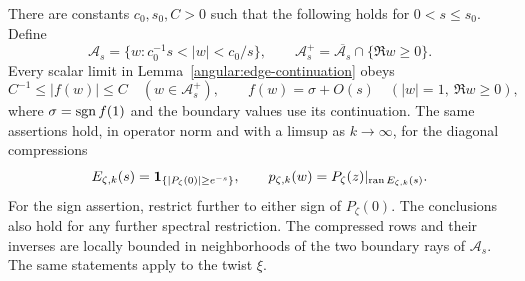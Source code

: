 \begin{lemma}
\label{angular:half-annulus}
There are constants $c_0,s_0,C>0$ such that the following holds for
$0<s\le s_0$.  Define
\[
 \mathcal A_s=\{w:c_0^{-1}s<|w|<c_0/s\},
 \qquad
 \mathcal A_s^+=\overline{\mathcal A_s}\cap\{\Re w\ge0\}.
\]
Every scalar limit in Lemma~\ref{angular:edge-continuation} obeys
\begin{equation}\label{angular:scalar-annulus-bound}
 C^{-1}\le |f(w)|\le C\quad(w\in\mathcal A_s^+),
 \qquad
 f(w)=\sigma+O(s)\quad(|w|=1,\ \Re w\ge0),
\end{equation}
where $\sigma=\operatorname{sgn} f(1)$ and the boundary values use its continuation.
The same assertions hold, in operator norm and with a limsup as
$k\to\infty$, for the diagonal compressions
\[
 E_{\zeta,k}(s)=
 \mathbf 1_{\{|P_\zeta(0)|\ge e^{-s}\}},
 \qquad
 p_{\zeta,k}(w)=P_\zeta(z)|_{\operatorname{ran}E_{\zeta,k}(s)}.
\]
For the sign assertion, restrict further to either sign of
$P_\zeta(0)$.  The conclusions also hold for any further spectral
restriction.  The compressed rows and their inverses are locally
bounded in neighborhoods of the two boundary rays of $\mathcal A_s$.
The same statements apply to the twist $\xi$.
\end{lemma}

